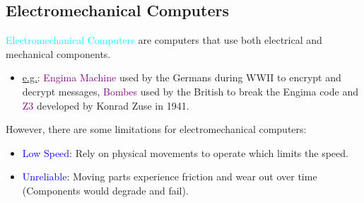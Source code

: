 \documentclass{book}
\begin{document}
\subsection{Electromechanical Computers}
\raggedright
\textcolor{cyan}{Electromechanical Computers} are computers that use both electrical and mechanical components.\\
\begin{itemize}
    \item \uline{e.g.}: \textcolor{purple}{Engima Machine} used by the Germans during WWII to encrypt and decrypt messages, \textcolor{purple}{Bombes} used by the British to break the Engima code and \textcolor{purple}{Z3} developed by Konrad Zuse in 1941.\\
\end{itemize}
However, there are some limitations for electromechanical computers:
\begin{itemize}
    \item \textcolor{blue}{Low Speed}: Rely on physical movements to operate which limits the speed.
    \item \textcolor{blue}{Unreliable}: Moving parts experience friction and wear out over time (Components would degrade and fail).
\end{itemize}
\end{document}

